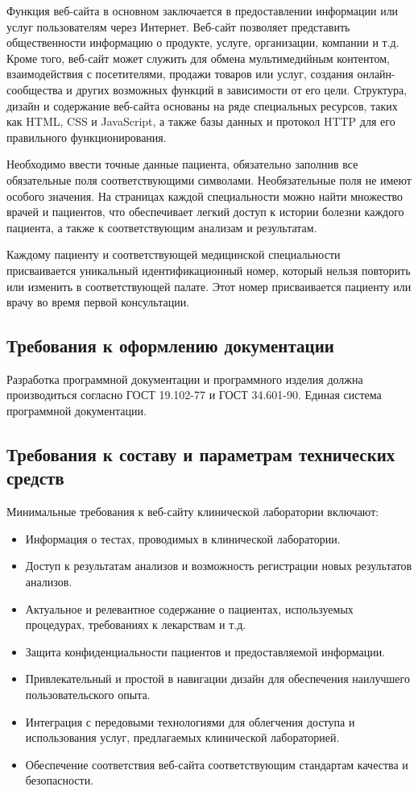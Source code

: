 Функция веб-сайта в основном заключается в предоставлении информации или услуг пользователям через Интернет. Веб-сайт позволяет представить общественности информацию о продукте, услуге, организации, компании и т.д. Кроме того, веб-сайт может служить для обмена мультимедийным контентом, взаимодействия с посетителями, продажи товаров или услуг, создания онлайн-сообщества и других возможных функций в зависимости от его цели. Структура, дизайн и содержание веб-сайта основаны на ряде специальных ресурсов, таких как HTML, CSS и JavaScript, а также базы данных и протокол HTTP для его правильного функционирования.

Необходимо ввести точные данные пациента, обязательно заполнив все обязательные поля соответствующими символами. Необязательные поля не имеют особого значения. На страницах каждой специальности можно найти множество врачей и пациентов, что обеспечивает легкий доступ к истории болезни каждого пациента, а также к соответствующим анализам и результатам.

Каждому пациенту и соответствующей медицинской специальности присваивается уникальный идентификационный номер, который нельзя повторить или изменить в соответствующей палате. Этот номер присваивается пациенту или врачу во время первой консультации.

\subsection{Требования к оформлению документации}

Разработка программной документации и программного изделия должна производиться согласно ГОСТ 19.102-77 и ГОСТ 34.601-90. Единая система программной документации.

\subsection{Требования к составу и параметрам технических  средств}

Минимальные требования к веб-сайту клинической лаборатории включают:

\begin{itemize}
	\item Информация о тестах, проводимых в клинической лаборатории.
	\item Доступ к результатам анализов и возможность регистрации новых результатов анализов.
	\item Актуальное и релевантное содержание о пациентах, используемых процедурах, требованиях к лекарствам и т.д.
	\item Защита конфиденциальности пациентов и предоставляемой информации.
	\item Привлекательный и простой в навигации дизайн для обеспечения наилучшего пользовательского опыта.
	\item Интеграция с передовыми технологиями для облегчения доступа и использования услуг, предлагаемых клинической лабораторией.
	\item Обеспечение соответствия веб-сайта соответствующим стандартам качества и безопасности.
\end{itemize}

